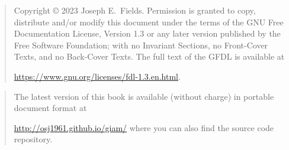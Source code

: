 \rule{0pt}{0pt}

\vfill

\begin{quote}
    Copyright \copyright{}  2023  Joseph E.\ Fields.
    Permission is granted to copy, distribute and/or modify this document
    under the terms of the GNU Free Documentation License, Version 1.3
    or any later version published by the Free Software Foundation;
    with no Invariant Sections, no Front-Cover Texts, and no Back-Cover Texts.
    The full text of the GFDL is available at\newline
	\rule{0pt}{0pt} \hspace{.5in} \url{https://www.gnu.org/licenses/fdl-1.3.en.html}.
\end{quote}

\vfill

\begin{quote}
The latest version of this book is available (without charge) in portable document format at\newline 
\rule{0pt}{0pt} \hspace{.5in} \url{http://osj1961.github.io/giam/} \newline
where you can also find the source code repository.


\end{quote}

\vfill
